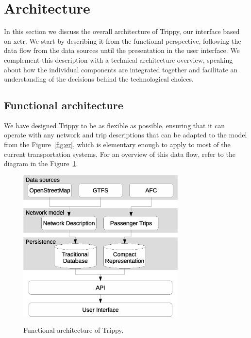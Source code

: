 	\section{Architecture}
	In this section we discuss the overall architecture of Trippy, our interface based on \gls{xctr}. We start by describing it from the functional perspective, following the data flow from the data sources until the presentation in the user interface. We complement this description with a technical architecture overview, speaking about how the individual components are integrated together and facilitate an understanding of the decisions behind the technological choices.
	
	\subsection{Functional architecture}
	We have designed Trippy to be as flexible as possible, ensuring that it can operate with any network and trip descriptions that can be adapted to the model from the Figure~\ref{fig:er}, which is elementary enough to apply to most of the current transportation systems. For an overview of this data flow, refer to the diagram in the Figure~\ref{fig:arch:functional}.
	
	\begin{figure}[ht]
		\begin{center}
			{\includegraphics[width=0.75\textwidth]{figures/funcional_trippy.eps}}
		\end{center}
		\caption{Functional architecture of Trippy.}
		\label{fig:arch:functional}
	\end{figure}
	

